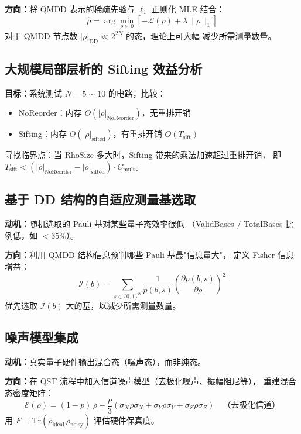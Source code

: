 \documentclass[12pt, a4paper]{article}
\begin{document}
\textbf{方向：}将 QMDD 表示的稀疏先验与 $\ell_1$ 正则化 MLE 结合：
\[
    \hat{\rho} = \arg\min_{\rho \succeq 0} \left[
        -\mathcal{L}(\rho) + \lambda \|\rho\|_1
    \right]
\]
对于 QMDD 节点数 $|\rho|_{\mathrm{DD}} \ll 2^{2N}$ 的态，理论上可大幅
减少所需测量数量。

\subsection{大规模局部层析的 Sifting 效益分析}

\textbf{目标：}系统测试 $N = 5 \sim 10$ 的电路，比较：
\begin{itemize}
    \item NoReorder：内存 $O(|\rho|_{\mathrm{NoReorder}})$，无重排开销
    \item Sifting：内存 $O(|\rho|_{\mathrm{sifted}})$，有重排开销 $O(T_{\mathrm{sift}})$
\end{itemize}

寻找临界点：当 RhoSize 多大时，Sifting 带来的乘法加速超过重排开销，
即 $T_{\mathrm{sift}} < (|\rho|_{\mathrm{NoReorder}} - |\rho|_{\mathrm{sifted}}) \cdot C_{\mathrm{mult}}$。

\subsection{基于 DD 结构的自适应测量基选取}

\textbf{动机：}随机选取的 Pauli 基对某些量子态效率很低
（ValidBases / TotalBases 比例低，如 $<35\%$）。

\textbf{方向：}利用 QMDD 结构信息预判哪些 Pauli 基最"信息量大"，
定义 Fisher 信息增益：
\[
    \mathcal{I}(b) = \sum_{s \in \{0,1\}^N}
    \frac{1}{p(b,s)} \left(\frac{\partial p(b,s)}{\partial \rho}\right)^2
\]
优先选取 $\mathcal{I}(b)$ 大的基，以减少所需测量数量。

\subsection{噪声模型集成}

\textbf{动机：}真实量子硬件输出混合态（噪声态），而非纯态。

\textbf{方向：}在 QST 流程中加入信道噪声模型（去极化噪声、振幅阻尼等），
重建混合态密度矩阵：
\[
    \mathcal{E}(\rho) = (1-p)\,\rho + \frac{p}{3}\left(
        \sigma_X\rho\sigma_X + \sigma_Y\rho\sigma_Y + \sigma_Z\rho\sigma_Z
    \right)
    \quad \text{（去极化信道）}
\]
用 $F = \mathrm{Tr}(\rho_{\mathrm{ideal}}\,\rho_{\mathrm{noisy}})$ 评估硬件保真度。
\end{document}
